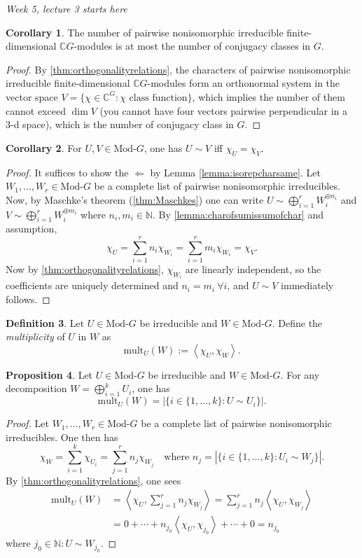 \documentclass[a4paper]{article}
\newcommand{\mult}{\text{mult}}
\newcommand{\la}{\left\langle}
\newcommand{\ra}{\right\rangle}
\newcommand{\N}{\mathbb{N}}
\newcommand{\C}{\mathbb{C}}
\newcommand{\Mod}{\text{Mod-}}
\theoremstyle{definition}
\newtheorem{defn}{Definition}[subsection]
\newtheorem{prop}[defn]{Proposition}
\newtheorem{coro}[defn]{Corollary}
\begin{document}
\begin{flushright}
\textit{Week 5, lecture 3 starts here}
\end{flushright}

\begin{coro}
\label{coro:nofpwniirfdisatmostnofconjclas}
The number of pairwise nonisomorphic irreducible finite-dimensional $\C G$-modules is at most the number of conjugacy classes in $G$.
\end{coro}
\begin{proof}
By \ref{thm:orthogonalityrelations}, the characters of pairwise nonisomorphic irreducible finite-dimensional $\C G$-modules form an orthonormal system in the vector space $V=\{\chi\in\C^G:\chi\text{ class function}\}$, which implies the number of them cannot exceed $\dim V$ (you cannot have four vectors pairwise perpendicular in a 3-d space), which is the number of conjugacy class in $G$.
\end{proof}

\begin{coro}
\label{coro:convisorepcharsame}
For $U,V\in\Mod G$, one has $U\sim V$ iff $\chi_U=\chi_V$.
\end{coro}
\begin{proof}
It suffices to show the $\Leftarrow$ by Lemma \ref{lemma:isorepcharsame}. Let $W_1,\ldots,W_r\in\Mod G$ be a complete list of pairwise nonisomorphic irreducibles. Now, by Maschke's theorem (\ref{thm:Maschkes}) one can write $U\sim\bigoplus_{i=1}^r W_i^{\oplus n_i}$ and $V\sim\bigoplus_{i=1}^r W_i^{\oplus m_i}$ where $n_i,m_i\in\N$. By \ref{lemma:charofsumissumofchar} and assumption,
\[
\chi_U=\sum_{i=1}^r n_i \chi_{W_i}=\sum_{i=1}^r m_i \chi_{W_i}=\chi_V.
\]
Now by \ref{thm:orthogonalityrelations}, $\chi_{W_i}$ are linearly independent, so the coefficients are uniquely determined and $n_i=m_i \ \forall i$, and $U\sim V$ immediately follows.
\end{proof}

\begin{defn}
Let $U\in\Mod G$ be irreducible and $W\in\Mod G$. Define the \textit{multiplicity} of $U$ in $W$ as
\[
\mult_U(W):=\la \chi_U,\chi_W\ra.
\]
\end{defn}

\begin{prop}
Let $U\in\Mod G$ be irreducible and $W\in\Mod G$. For any decomposition $W=\bigoplus_{i=1}^k U_i$, one has
\[
\mult_U(W)=|\{i\in\{1,\ldots,k\}:U\sim U_i\}|.
\]
\end{prop}
\begin{proof}
Let $W_1,\ldots,W_r\in\Mod G$ be a complete list of pairwise nonisomorphic irreducibles. One then has
\[
\chi_W=\sum_{i=1}^k \chi_{U_i}=\sum_{j=1}^r n_j \chi_{W_j} \quad\text{where }n_j=|\{i\in\{1,\ldots,k\}:U_i\sim W_j\}|.
\]
By \ref{thm:orthogonalityrelations}, one sees
\[
\begin{aligned}
\mult_U(W)&=\la\chi_U,\sum_{j=1}^r n_j \chi_{W_j}\ra=\sum_{j=1}^r n_j\la\chi_U,\chi_{W_j}\ra\\
&=0+\cdots+n_{j_0}\la\chi_U,\chi_{j_0}\ra+\cdots+0=n_{j_0}
\end{aligned}
\]
where $j_0\in\N:U\sim W_{j_0}$.
\end{proof}
\end{document}
